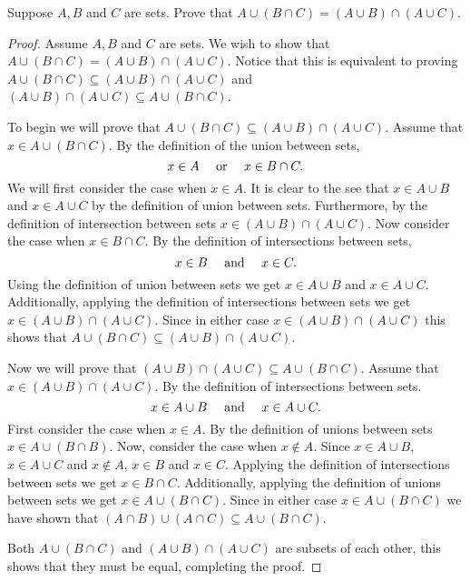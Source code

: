 \documentclass{report}
\begin{document}
\begin{proposition}{}{}
  Suppose $A, B$ and $C$ are sets.
  Prove that $A \cup \left(B \cap C \right) = \left(A \cup B \right) \cap \left(A \cup C\right)$.
\end{proposition}

\begin{proof}
  Assume $A, B$ and $C$ are sets.
  We wish to show that $A \cup \left(B \cap C \right) = \left(A \cup B \right) \cap \left(A \cup C\right)$.
  Notice that this is equivalent to proving $A \cup \left(B \cap C \right) \subseteq \left(A \cup B \right) \cap \left(A \cup C\right)$ and $\left(A \cup B \right) \cap \left(A \cup C\right) \subseteq A \cup \left(B \cap C\right)$.

  To begin we will prove that $A \cup \left(B \cap C\right) \subseteq \left(A \cup B\right) \cap \left(A \cup C\right)$.
  Assume that $x \in A \cup \left(B \cap C\right)$.
  By the definition of the union between sets, $$x \in A \quad \text{ or } \quad x \in B \cap C.$$
  We will first consider the case when $x \in A$.
  It is clear to the see that $x \in A \cup B$ and $x \in A \cup C$ by the definition of union between sets.
  Furthermore, by the definition of intersection between sets $x \in \left(A \cup B\right) \cap \left(A \cup C\right)$.
  Now consider the case when $x \in B \cap C$. By the definition of intersections between sets, $$x \in B \quad \text{ and } \quad x \in C.$$
  Using the definition of union between sets we get $x \in A \cup B$ and $x \in A \cup C$.
  Additionally, applying the definition of intersections between sets we get $x \in \left(A \cup B\right) \cap \left(A \cup C\right)$.
  Since in either case $x \in \left(A \cup B\right) \cap \left(A \cup C\right)$ this shows that $A \cup \left(B \cap C\right) \subseteq \left(A \cup B\right) \cap \left(A \cup C\right)$.

  Now we will prove that $\left(A \cup B\right) \cap \left(A \cup C\right) \subseteq A \cup \left(B \cap C\right)$.
  Assume that $x \in \left(A \cup B\right) \cap \left(A \cup C\right)$.
  By the definition of intersections between sets. $$x \in A \cup B \quad \text{ and } \quad x \in A \cup C.$$
  First consider the case when $x \in A$.
  By the definition of unions between sets $x \in A \cup \left(B \cap B\right)$.
  Now, consider the case when $x \notin A$. Since $x \in A \cup B$, $x \in A \cup C$ and $x \notin A$,  $x \in B$ and $x \in C$.
  Applying the definition of intersections between sets we get $x \in B \cap C$.
  Additionally, applying the definition of unions between sets we get $x \in A \cup \left(B \cap C\right)$.
  Since in either case $x \in A \cup \left(B \cap C\right)$ we have shown that $\left(A \cap B\right) \cup \left(A \cap C\right) \subseteq A \cup \left(B \cap C\right)$.

  Both $A \cup \left(B \cap C\right)$ and $\left(A \cup B\right) \cap \left(A \cup C\right)$ are subsets of each other, this shows that they must be equal, completing the proof.
\end{proof}
\end{document}
